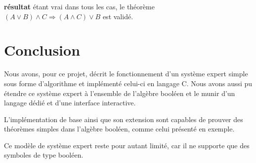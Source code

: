 \documentclass[12pt]{article}
\begin{document}
\textbf{résultat} étant vrai dans tous les cas, le théorème $(A \lor B) \land C \Rightarrow (A \land C) \lor B$ est validé.

\section{Conclusion}

Nous avons, pour ce projet, décrit le fonctionnement d'un système expert simple sous forme d'algorithme et implémenté celui-ci en langage C.
Nous avons aussi pu étendre ce système expert à l'ensemble de l'algèbre booléen et le munir d'un langage dédié et d'une interface interactive.

L'implémentation de base ainsi que son extension sont capables de prouver des théorèmes simples dans l'algèbre booléen, comme celui présenté en exemple.

Ce modèle de système expert reste pour autant limité, car il ne supporte que des symboles de type booléen.
\end{document}
